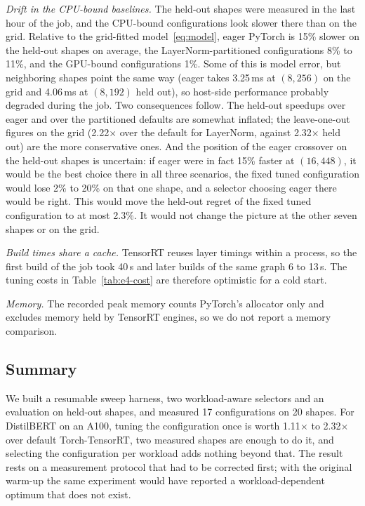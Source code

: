 \emph{Drift in the CPU-bound baselines.} The held-out shapes were measured
in the last hour of the job, and the CPU-bound configurations look slower
there than on the grid. Relative to the grid-fitted model~\eqref{eq:model},
eager PyTorch is 15\% slower on the held-out shapes on average, the
LayerNorm-partitioned configurations 8\% to 11\%, and the GPU-bound
configurations 1\%. Some of this is model error, but neighboring shapes point
the same way (eager takes 3.25\,ms at $(8,256)$ on the grid and 4.06\,ms at
$(8,192)$ held out), so host-side performance probably degraded during the
job. Two consequences follow. The held-out speedups over eager and over the
partitioned defaults are somewhat inflated; the leave-one-out figures on the
grid (2.22$\times$ over the default for LayerNorm, against 2.32$\times$ held
out) are the more conservative ones. And the position of the eager crossover
on the held-out shapes is uncertain: if eager were in fact 15\% faster at
$(16,448)$, it would be the best choice there in all three scenarios, the
fixed tuned configuration would lose 2\% to 20\% on that one shape, and a
selector choosing eager there would be right. This would move the
held-out regret of the fixed tuned configuration to at most 2.3\%. It would not
change the picture at the other seven shapes or on the grid.

\emph{Build times share a cache.} TensorRT reuses layer timings within a
process, so the first build of the job took 40\,s and later builds of the same
graph 6 to 13\,s. The tuning costs in Table~\ref{tab:e4-cost} are therefore
optimistic for a cold start.

\emph{Memory.} The recorded peak memory counts PyTorch's allocator only and
excludes memory held by TensorRT engines, so we do not report a memory
comparison.

\subsection{Summary}
\label{sec:e4-summary}

We built a resumable sweep harness, two workload-aware selectors and an
evaluation on held-out shapes, and measured 17 configurations on 20 shapes.
For DistilBERT on an A100, tuning the configuration once is worth
1.11$\times$ to 2.32$\times$ over default Torch-TensorRT, two measured shapes
are enough to do it, and selecting the configuration per workload adds nothing
beyond that. The result rests on a measurement protocol that had to be
corrected first; with the original warm-up the same experiment would have
reported a workload-dependent optimum that does not exist.
